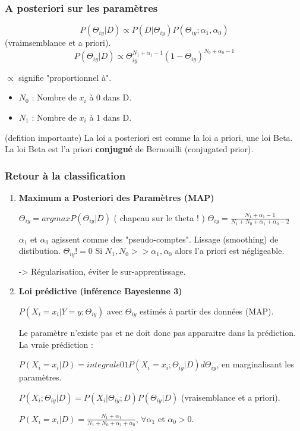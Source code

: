 \documentclass{article}
\begin{document}
\subsubsection{A posteriori sur les paramètres}

\[ P(\Theta_{iy} | D) \propto P(D | \Theta_{iy}) P(\Theta_{iy}; \alpha_1, \alpha_0) \] (vraimsemblance et a priori).
\[ P(\Theta_{iy} | D) \propto \Theta_{iy}^{N_1 + \alpha_1 - 1} (1 - \Theta_{iy})^{N_0 + \alpha_0 - 1} \]

$\propto$ signifie "proportionnel à".

\begin{itemize}
\item $N_0$ : Nombre de $x_i$ à 0 dans D.
\item $N_1$ : Nombre de $x_i$ à 1 dans D.
\end{itemize}

(defition importante)
La loi a posteriori est comme la loi a priori, une loi Beta. La loi Beta est l'a priori \textbf{conjugué} de Bernouilli (conjugated prior).

\subsubsection{Retour à la classification}

\begin{enumerate}

\item \textbf{Maximum a Posteriori des Paramètres (MAP)}

$ \Theta_{iy} = argmax P(\Theta_{iy} | D) $ ( chapeau sur le theta ! )
$ \Theta_{iy} = \frac{N_1 + \alpha_1 - 1}{N_1 + N_0 + \alpha_1 + \alpha_0 - 2} $

$\alpha_1$ et $\alpha_0$ agissent comme des "pseudo-comptes". Lissage (smoothing) de distibution.
$\Theta_{iy} != 0$
Si $N_1, N_0 >> \alpha_1, \alpha_0$ alors l'a priori est négligeable.

-> Régularisation, éviter le sur-apprentissage.

\item \textbf{Loi prédictive (inférence Bayesienne 3)}

$P(X_i = x_i | Y = y; \Theta_{iy})$ avec $\Theta_{iy}$ estimés à partir des données (MAP).

Le paramètre n'existe pas et ne doit donc pas apparaitre dans la prédiction. La vraie prédiction :

$P(X_i = x_i | D) = integrale01 P(X_i = x_i; \Theta_{iy} | D) d \Theta_{iy}$, en marginalisant les paramètres.

$P(X_i; \Theta_{iy} | D) = P(X_i | \Theta_{iy}; D) P(\Theta_{iy} | D)$ (vraisemblance et a priori).

$ P(X_i = x_i | D) = \frac{N_1 + \alpha_1}{N_1 + N_0 + \alpha_1 + \alpha_0}$, $\forall \alpha_1$ et $\alpha_0 > 0$.

\end{enumerate}
\end{document}
